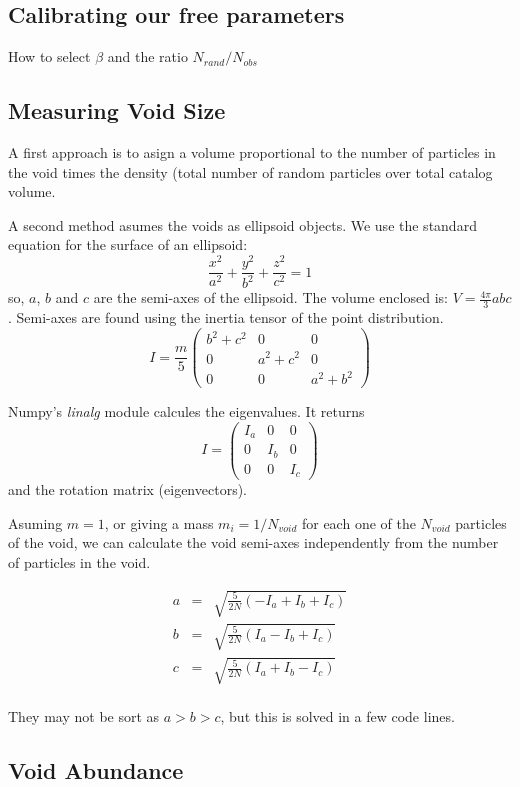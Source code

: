 \documentclass[preprint]{aastex62}
\begin{document}
\subsection{Calibrating our free parameters}
How to select $\beta$ and the ratio $N_{rand}/N_{obs}$

\subsection{Measuring Void Size}

A first approach is to asign a volume proportional to the number of particles
in the void times the density (total number of random particles over total
catalog volume.

A second method asumes the voids as ellipsoid objects. 
We use the standard equation for the surface of an ellipsoid:
\begin{equation}
\frac{x^2}{a^2} + \frac{y^2}{b^2} + \frac{z^2}{c^2} = 1 
\end{equation}
so, $a$, $b$ and $c$ are the semi-axes of the ellipsoid. The volume enclosed is:
$V = \frac{4\pi}{3}abc$.
Semi-axes are found using the inertia tensor of the point distribution.
\begin{equation}
    I = \frac{m}{5} \left( 
    \begin{array}{ccc}
    b^2 + c^2 &  0  &  0 \\
    0   & a^2 + c^2 &  0 \\ 
    0   &  0  &  a^2 + b^2 
    \end{array}\right)
\end{equation}

Numpy's \textit{linalg} module calcules the eigenvalues. It
returns
\begin{equation}
    I = \left( 
    \begin{array}{ccc}
    I_a &  0  &  0 \\
    0   & I_b &  0 \\ 
    0   &  0  &  I_c 
    \end{array}\right)
\end{equation}
and the rotation matrix (eigenvectors).

Asuming $m=1$, or giving a mass $m_i = 1/N_{void}$ for each one of the $N_{void}$
particles of the void, we can calculate the void semi-axes independently from the
number of particles in the void.

\begin{eqnarray}
  a &=& \sqrt{ \frac{5}{2N} \left(-I_a + I_b + I_c \right)} \nonumber\\
  b &=& \sqrt{ \frac{5}{2N} \left( I_a - I_b + I_c \right)} \nonumber\\
  c &=& \sqrt{ \frac{5}{2N} \left( I_a + I_b - I_c \right)} \nonumber\\
\end{eqnarray}

They may not be sort as $a>b>c$, but this is solved in a few code lines.


\subsection{Void Abundance}
\end{document}
